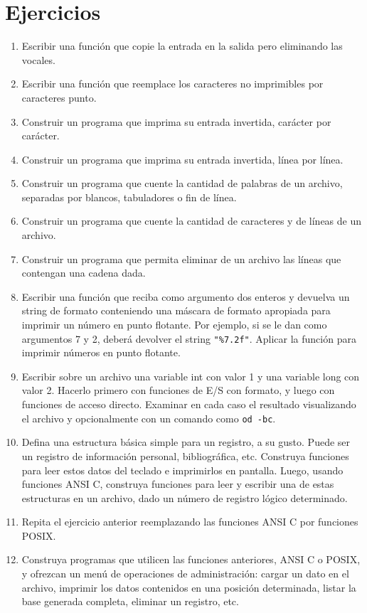 \section{Ejercicios}
\begin{enumerate}
\item Escribir una función que copie la entrada en la salida pero eliminando las
vocales.
\item Escribir una función que reemplace los caracteres no imprimibles por
caracteres punto.
\item Construir un programa que imprima su entrada invertida, carácter por carácter.
\item Construir un programa que imprima su entrada invertida, línea por línea.
\item Construir un programa que cuente la cantidad de palabras de un archivo,
separadas por blancos, tabuladores o fin de línea.
\item Construir un programa que cuente la cantidad de caracteres y de líneas de un
archivo.
\item Construir un programa que permita eliminar de un archivo las líneas que
contengan una cadena dada.
\item Escribir una función que reciba como argumento dos enteros y devuelva un
string de formato conteniendo una máscara de formato apropiada para imprimir un
número en punto flotante. Por ejemplo, si se le dan como argumentos 7 y 2,
deberá devolver el string \lstinline{"%7.2f"}. Aplicar la función para imprimir números en
punto flotante.
\item Escribir sobre un archivo una variable int con valor 1 y una variable long
con valor 2. Hacerlo primero con funciones de E/S con formato, y luego con
funciones de acceso directo. Examinar en cada caso el resultado visualizando el
archivo y opcionalmente con un comando como \lstinline{od -bc}.
\item Defina una estructura básica simple para un registro, a su gusto. Puede ser
un registro de información personal, bibliográfica, etc. Construya funciones
para leer estos datos del teclado e imprimirlos en pantalla. Luego, usando
funciones ANSI C, construya funciones para leer y escribir una de estas
estructuras en un archivo, dado un número de registro lógico determinado.
\item Repita el ejercicio anterior reemplazando las funciones ANSI C por funciones
POSIX.
\item Construya programas que utilicen las funciones anteriores, ANSI C o POSIX,
y ofrezcan un menú de operaciones de administración: cargar un dato en el
archivo, imprimir los datos contenidos en una posición determinada, listar la
base generada completa, eliminar un registro, etc.
\end{enumerate}



